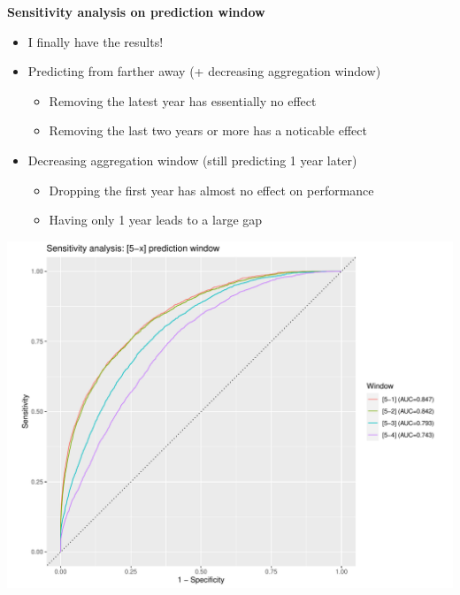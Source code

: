 \documentclass[12pt]{article}
\begin{document}
\clearpage\newpage

\textbf{Sensitivity analysis on prediction window}
\begin{itemize}
	\item I finally have the results!
	\item Predicting from farther away (+ decreasing aggregation window)
	\begin{itemize}
		\item Removing the latest year has essentially no effect
		\item Removing the last two years or more has a noticable effect
	\end{itemize}
	\item Decreasing aggregation window (still predicting 1 year later)
	\begin{itemize}
		\item Dropping the first year has almost no effect on performance
		\item Having only 1 year leads to a large gap
	\end{itemize}
\end{itemize}

\begin{center}
\includegraphics[width=\textwidth]{sensitivity_window/roc_curves_5-x.pdf}
\end{center}
\end{document}
